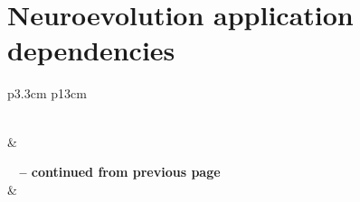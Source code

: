 
\chapter{Neuroevolution application dependencies}
\label{appendix:python_dependencies}

\begin{center}
\begin{longtable}{p{3.3cm} p{13cm}}
\caption[Dependencies]{Dependencies} \label{tab:neuroevolution_dependencies} \\

\hline {} &  \\ \hline 
\endfirsthead

{{\bfseries \tablename\ \thetable{} -- continued from previous page}} \\
\hline {} &  \\ \hline 
\endhead

\hline {} \\ \hline
\endfoot

\hline \hline
\endlastfoot


\end{longtable}
\end{center}
